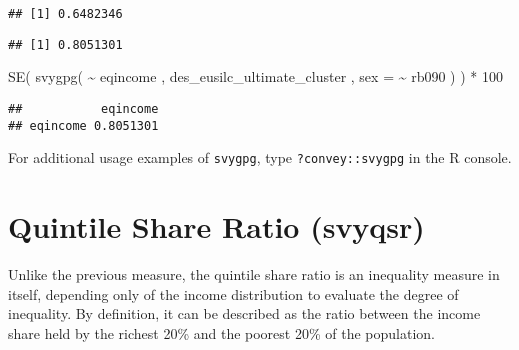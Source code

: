 \documentclass[
]{book}
\newenvironment{Shaded}{\begin{snugshade}}{\end{snugshade}}
\newcommand{\AttributeTok}[1]{\textcolor[rgb]{0.77,0.63,0.00}{#1}}
\newcommand{\CommentTok}[1]{\textcolor[rgb]{0.56,0.35,0.01}{\textit{#1}}}
\newcommand{\DecValTok}[1]{\textcolor[rgb]{0.00,0.00,0.81}{#1}}
\newcommand{\FunctionTok}[1]{\textcolor[rgb]{0.00,0.00,0.00}{#1}}
\newcommand{\NormalTok}[1]{#1}
\newcommand{\SpecialCharTok}[1]{\textcolor[rgb]{0.00,0.00,0.00}{#1}}
\begin{document}
\begin{Shaded}
\end{Shaded}

\begin{verbatim}
## [1] 0.6482346
\end{verbatim}

\begin{Shaded}
\end{Shaded}

\begin{verbatim}
## [1] 0.8051301
\end{verbatim}

\begin{Shaded}
\begin{Highlighting}[]
\FunctionTok{SE}\NormalTok{( }\FunctionTok{svygpg}\NormalTok{( }\SpecialCharTok{\textasciitilde{}}\NormalTok{ eqincome , des\_eusilc\_ultimate\_cluster , }\AttributeTok{sex =} \SpecialCharTok{\textasciitilde{}}\NormalTok{ rb090 ) ) }\SpecialCharTok{*} \DecValTok{100}
\end{Highlighting}
\end{Shaded}

\begin{verbatim}
##           eqincome
## eqincome 0.8051301
\end{verbatim}

For additional usage examples of \texttt{svygpg}, type \texttt{?convey::svygpg} in the R console.

\hypertarget{quintile-share-ratio-svyqsr}{%
\section{Quintile Share Ratio (svyqsr)}\label{quintile-share-ratio-svyqsr}}

Unlike the previous measure, the quintile share ratio is an inequality measure in itself, depending only of the income distribution to evaluate the degree of inequality. By definition, it can be described as the ratio between the income share held by the richest 20\% and the poorest 20\% of the population.
\end{document}
